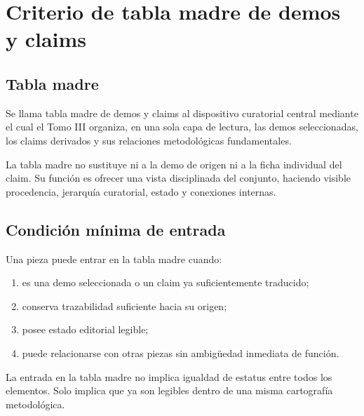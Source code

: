 \chapter{Criterio de tabla madre de demos y claims}

\section{Tabla madre}
\begin{definition}
Se llama tabla madre de demos y claims al dispositivo curatorial central mediante el cual el Tomo III organiza, en una sola capa de lectura, las demos seleccionadas, los claims derivados y sus relaciones metodológicas fundamentales.
\end{definition}

\begin{observation}
La tabla madre no sustituye ni a la demo de origen ni a la ficha individual del claim. Su función es ofrecer una vista disciplinada del conjunto, haciendo visible procedencia, jerarquía curatorial, estado y conexiones internas.
\end{observation}

\section{Condición mínima de entrada}
\begin{definition}
Una pieza puede entrar en la tabla madre cuando:
\begin{enumerate}
  \item es una demo seleccionada o un claim ya suficientemente traducido;
  \item conserva trazabilidad suficiente hacia su origen;
  \item posee estado editorial legible;
  \item puede relacionarse con otras piezas sin ambigüedad inmediata de función.
\end{enumerate}
\end{definition}

\begin{observation}
La entrada en la tabla madre no implica igualdad de estatus entre todos los elementos. Solo implica que ya son legibles dentro de una misma cartografía metodológica.
\end{observation}

